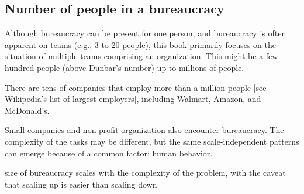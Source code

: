 \subsection{Number of people in a bureaucracy}
Although bureaucracy can be present for one person, and bureaucracy is often apparent on teams (e.g., 3 to 20 people), this book primarily focuses on the situation of multiple teams comprising an organization. This might be a few hundred people (above \href{https://en.wikipedia.org/wiki/Dunbar's_number}{Dunbar's number}) up to millions of people. 

There are tens of companies that employ more than a million people [see \href{https://en.wikipedia.org/wiki/List_of_largest_employers}{Wikipedia's list of largest employers}], including Walmart, Amazon, and McDonald's.

Small companies and non-profit organization also encounter bureaucracy. The complexity of the tasks may be different, but the same scale-independent patterns can emerge because of a common factor: human behavior.



size of bureaucracy scales with the complexity of the problem, with the caveat that scaling up is easier than scaling down